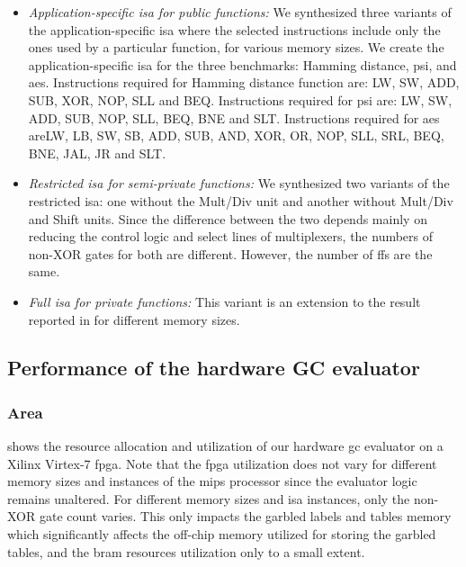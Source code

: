 \begin{itemize}
	\item \emph{Application-specific \acrshort{isa} for public functions:} We synthesized three variants of the application-specific \acrshort{isa} where the selected instructions include only the ones used by a particular function, for various memory sizes.
	We create the application-specific \acrshort{isa} for the three benchmarks: Hamming distance, \acrshort{psi}, and \acrshort{aes}.
	Instructions required for Hamming distance function are: LW, SW, ADD, SUB, XOR, NOP, SLL and BEQ.
	Instructions required for \acrshort{psi} are: LW, SW, ADD, SUB, NOP, SLL, BEQ, BNE and SLT.
 	Instructions required for \acrshort{aes} areLW, LB, SW, SB, ADD, SUB, AND, XOR, OR, NOP, SLL, SRL, BEQ, BNE, JAL, JR and SLT.

	\item \emph{Restricted \acrshort{isa} for semi-private functions:} We synthesized two variants of the restricted \acrshort{isa}: one without the Mult/Div unit and another without Mult/Div and Shift units.
	Since the difference between the two depends mainly on reducing the control logic and select lines of multiplexers, the numbers of non-XOR gates for both are different.
	However, the number of \acrshort{ff}s are the same.

	\item \emph{Full \acrshort{isa} for private
	functions:} This variant is an extension to the result reported in  for different memory sizes.
\end{itemize}

\subsection{Performance of the hardware GC evaluator}
\subsubsection{Area}
 shows the resource allocation and utilization of our hardware \acrshort{gc} evaluator on a Xilinx Virtex-7 \acrshort{fpga}.
Note that the \acrshort{fpga} utilization does not vary for different memory sizes and instances of the \gls{mips} processor since the evaluator logic remains unaltered.
For different memory sizes and \acrshort{isa} instances, only the non-XOR gate count varies.
This only impacts the garbled labels and tables memory which significantly affects the off-chip memory utilized for storing the garbled tables, and the \acrfull{bram} resources utilization only to a small extent.

